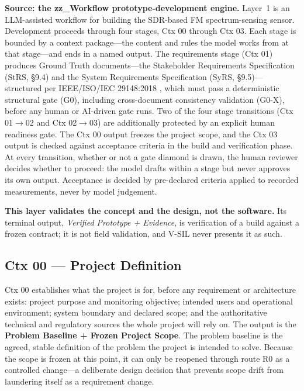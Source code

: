 \documentclass[11pt,a4paper]{article}
\begin{document}
\textbf{Source: the zz\_Workflow prototype-development engine.} Layer~1 is an LLM-assisted
workflow for building the SDR-based FM spectrum-sensing sensor. Development proceeds through
four stages, Ctx 00 through Ctx 03. Each stage is bounded by a context package---the content and
rules the model works from at that stage---and ends in a named output. The requirements stage
(Ctx 01) produces Ground Truth documents---the Stakeholder Requirements Specification (StRS,
\S9.4) and the System Requirements Specification (SyRS, \S9.5)---structured per
IEEE/ISO/IEC 29148:2018 \cite{ieee29148}, which must pass a deterministic structural gate (G0),
including cross-document consistency validation (G0-X), before any human or AI-driven gate runs. Two of the
four stage transitions (Ctx 01$\rightarrow$02 and Ctx 02$\rightarrow$03) are additionally
protected by an explicit human readiness gate. The Ctx 00 output freezes the project scope, and
the Ctx 03 output is checked against acceptance criteria in the build and verification phase.
At every transition, whether or not a gate diamond is drawn, the human reviewer decides whether
to proceed: the model drafts within a stage but never approves its own output. Acceptance is
decided by pre-declared criteria applied to recorded measurements, never by model judgement.

\textbf{This layer validates the concept and the design, not the software.} Its terminal output,
\emph{Verified Prototype + Evidence}, is verification of a build against a frozen contract; it is
not field validation, and V-SIL never presents it as such.

\subsection{Ctx 00 --- Project Definition}
\label{sec:ctx00}

Ctx 00 establishes what the project is for, before any requirement or architecture exists:
project purpose and monitoring objective; intended users and operational environment; system
boundary and declared scope; and the authoritative technical and regulatory sources the whole
project will rely on. The output is the \textbf{Problem Baseline + Frozen Project Scope}. The
problem baseline is the agreed, stable definition of the problem the project is intended to
solve. Because the scope is frozen at this point, it can only be reopened through route R0 as a
controlled change---a deliberate design decision that prevents scope drift from laundering
itself as a requirement change.
\end{document}
